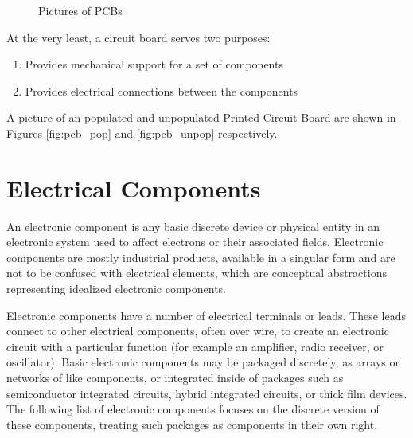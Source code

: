 \begin{center}


\begin{figure}[p]
\begin{center}
\end{center}
\caption{Pictures of PCBs}
\label{fig:pcb_pix}
\end{figure}
\end{center}

At the very least, a circuit board serves two purposes:
\begin{enumerate}
\item Provides mechanical support for a set of components
\item Provides electrical connections between the components
\end{enumerate}

A picture of an populated and unpopulated Printed Circuit Board are shown in Figures \ref{fig:pcb_pop} and \ref{fig:pcb_unpop} respectively. 

\section{Electrical Components}

An electronic component is any basic discrete device or physical entity in an electronic system used to affect electrons or their associated fields. Electronic components are mostly industrial products, available in a singular form and are not to be confused with electrical elements, which are conceptual abstractions representing idealized electronic components.

Electronic components have a number of electrical terminals or leads. These leads connect to other electrical components, often over wire, to create an electronic circuit with a particular function (for example an amplifier, radio receiver, or oscillator). Basic electronic components may be packaged discretely, as arrays or networks of like components, or integrated inside of packages such as semiconductor integrated circuits, hybrid integrated circuits, or thick film devices. The following list of electronic components focuses on the discrete version of these components, treating such packages as components in their own right. 

